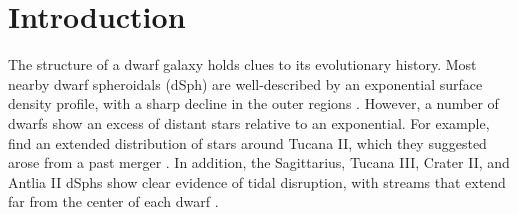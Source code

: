 \documentclass[times,trackchanges, twocolumn, twocolappendix]{aastex701}
\begin{document}




\section{Introduction\label{sec:intro}}

The  structure of a dwarf galaxy holds clues to its
evolutionary history.
Most nearby dwarf spheroidals (dSph) are well-described by an exponential
surface density profile, with a sharp decline in the outer regions \citep[e.g.,][]{mateo1998, mcconnachie+irwin2006, kowalczyk+2013, martin+2016, cicuendez+2018, munoz+2018}. 
However, a number of dwarfs show an  excess of distant stars relative to an exponential.
For example, \citet{chiti+2021} find an extended distribution of stars around Tucana II, which they suggested arose from a past merger \citep[see also][]{tarumi+yoshida+frebel2021, querci+2025}. In addition, the Sagittarius, Tucana III, Crater II, and Antlia II dSphs show clear evidence of tidal disruption, with streams that extend far from the center of each dwarf \citep[e.g.,][]{ibata+gilmore+irwin1994, li+2018, vivas+2022, ji2025}. 
\end{document}
